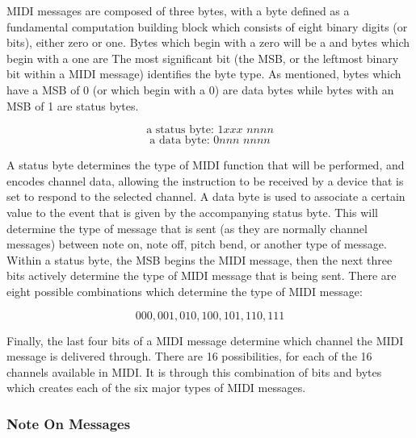 MIDI messages are composed of three bytes, with a byte defined as a fundamental computation building block which consists of eight binary digits (or bits), either zero or one. Bytes which begin with a zero will be a  and bytes which begin with a one are  The most significant bit (the MSB, or the leftmost binary bit within a MIDI message) identifies the byte type. As mentioned, bytes which have a MSB of 0 (or which begin with a 0) are data bytes while bytes with an MSB of 1 are status bytes.

\[\textrm{a status byte: } \textit{1xxx nnnn} \] \[\textrm{a data byte: } \textit{0nnn nnnn} \]

A status byte determines the type of MIDI function that will be performed, and encodes channel data, allowing the instruction to be received by a device that is set to respond to the selected channel. A data byte is used to associate a certain value to the event that is given by the accompanying status byte. This will determine the type of message that is sent (as they are normally channel messages) between note on, note off, pitch bend, or another type of message. Within a status byte, the MSB begins the MIDI message, then the next three bits actively determine the type of MIDI message that is being sent. There are eight possible combinations which determine the type of MIDI message:

\[000, 001, 010, 100, 101, 110, 111 \]

Finally, the last four bits of a MIDI message determine which channel the MIDI message is delivered through. There are 16 possibilities, for each of the 16 channels available in MIDI. It is through this combination of bits and bytes which creates each of the six major types of MIDI messages.

\subsubsection{Note On Messages}

